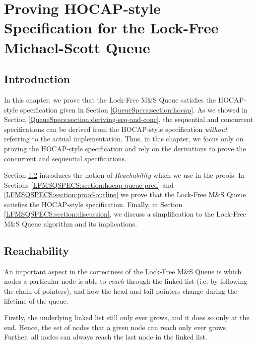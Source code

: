 \documentclass[a4paper, 10pt]{report}
\theoremstyle{definition}
\newcommand{\msq}{M\&S Queue}
\newcommand{\lfmsq}{Lock-Free \msq{}}
\begin{document}

\chapter{Proving HOCAP-style Specification for the Lock-Free Michael-Scott Queue}
\label{ch:LFMSQSPECS}

\section{Introduction}
\label{LFMSQSPECS:section:introduction}

In this chapter, we prove that the \lfmsq{} satisfies the HOCAP-style specification given in Section \ref{QueueSpecs:section:hocap}. As we showed in Section \ref{QueueSpecs:section:deriving-seq-and-conc}, the sequential and concurrent specifications can be derived from the HOCAP-style specification \emph{without} referring to the actual implementation. Thus, in this chapter, we focus only on proving the HOCAP-style specification and rely on the derivations to prove the concurrent and sequential specifications.

Section \ref{LFMSQSPECS:section:reachability} introduces the notion of \textit{Reachability} which we use in the proofs. In Sections \ref{LFMSQSPECS:section:hocap-queue-pred} and \ref{LFMSQSPECS:section:proof-outline} we prove that the \lfmsq{} satisfies the HOCAP-style specification. Finally, in Section \ref{LFMSQSPECS:section:discussion}, we discuss a simplification to the \lfmsq{} algorithm and its implications.

\section{Reachability}
\label{LFMSQSPECS:section:reachability}

An important aspect in the correctness of the \lfmsq{} is which nodes a particular node is able to \textit{reach} through the linked list (i.e. by following the chain of pointers), and how the head and tail pointers change during the lifetime of the queue.

Firstly, the underlying linked list still only ever grows, and it does so only at the end. Hence, the set of nodes that a given node can reach only ever grows. Further, all nodes can always reach the last node in the linked list.
\end{document}
